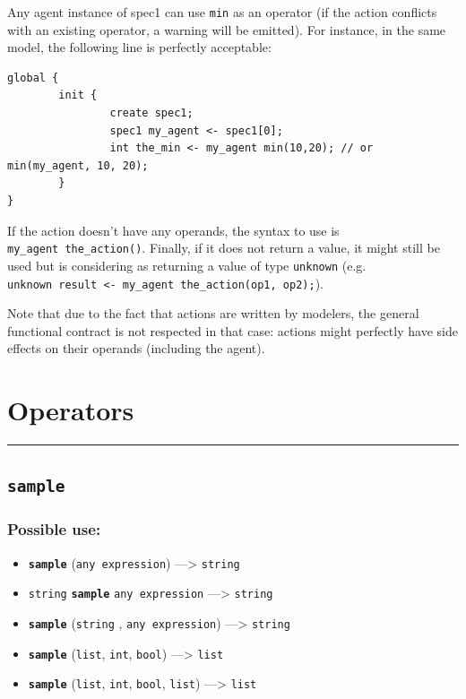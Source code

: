 \documentclass[]{book}
\providecommand{\tightlist}{%
  \setlength{\itemsep}{0pt}\setlength{\parskip}{0pt}}
\theoremstyle{definition}
\theoremstyle{definition}
\theoremstyle{definition}
\theoremstyle{remark}
\begin{document}
Any agent instance of spec1 can use \texttt{min} as an operator (if the
action conflicts with an existing operator, a warning will be emitted).
For instance, in the same model, the following line is perfectly
acceptable:

\begin{verbatim}
global {
        init {
                create spec1;
                spec1 my_agent <- spec1[0];
                int the_min <- my_agent min(10,20); // or min(my_agent, 10, 20);
        }
}
\end{verbatim}

If the action doesn't have any operands, the syntax to use is
\texttt{my\_agent\ the\_action()}. Finally, if it does not return a
value, it might still be used but is considering as returning a value of
type \texttt{unknown} (e.g.
\texttt{unknown\ result\ \textless{}-\ my\_agent\ the\_action(op1,\ op2);}).

Note that due to the fact that actions are written by modelers, the
general functional contract is not respected in that case: actions might
perfectly have side effects on their operands (including the agent).

\section{Operators}\label{operators-5}

\begin{center}\rule{0.5\linewidth}{\linethickness}\end{center}

\subsection{\texorpdfstring{\texttt{sample}}{sample}}\label{sample}

\subsubsection{Possible use:}\label{possible-use-448}

\begin{itemize}
\tightlist
\item
  \textbf{\texttt{sample}} (\texttt{any\ expression}) ---\textgreater{}
  \texttt{string}
\item
  \texttt{string} \textbf{\texttt{sample}} \texttt{any\ expression}
  ---\textgreater{} \texttt{string}
\item
  \textbf{\texttt{sample}} (\texttt{string} , \texttt{any\ expression})
  ---\textgreater{} \texttt{string}
\item
  \textbf{\texttt{sample}} (\texttt{list}, \texttt{int}, \texttt{bool})
  ---\textgreater{} \texttt{list}
\item
  \textbf{\texttt{sample}} (\texttt{list}, \texttt{int}, \texttt{bool},
  \texttt{list}) ---\textgreater{} \texttt{list}
\end{itemize}
\end{document}
